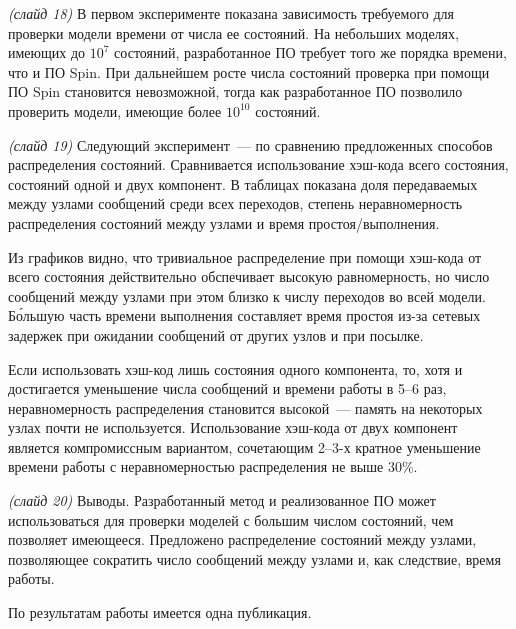 \documentclass[a4paper,12pt,notitlepage]{article}
\begin{document}
\emph{(слайд 18)} В первом эксперименте показана зависимость требуемого для проверки
модели времени от числа ее состояний. На небольших моделях, имеющих до $10^7$ состояний,
разработанное ПО требует того же порядка времени, что и ПО Spin. При дальнейшем росте
числа состояний проверка при помощи ПО Spin становится невозможной, тогда как
разработанное ПО позволило проверить модели, имеющие более $10^{10}$ состояний.


\emph{(слайд 19)} Следующий эксперимент~--- по сравнению предложенных способов
распределения состояний. Сравнивается использование хэш-кода всего состояния, состояний
одной и двух компонент. В таблицах показана доля передаваемых между узлами сообщений среди
всех переходов, степень неравномерность распределения состояний между узлами и время
простоя/выполнения.

Из графиков видно, что тривиальное распределение при помощи хэш-кода от всего состояния
действительно обспечивает высокую равномерность, но число сообщений между узлами при этом
близко к числу переходов во всей модели. Б\'{о}льшую часть времени выполнения составляет
время простоя из-за сетевых задержек при ожидании сообщений от других узлов и при посылке.

Если использовать хэш-код лишь состояния одного компонента, то, хотя и достигается
уменьшение числа сообщений и времени работы в 5--6 раз, неравномерность распределения
становится высокой~--- память на некоторых узлах почти не используется. Использование
хэш-кода от двух компонент является компромиссным вариантом, сочетающим 2--3-х кратное
уменьшение времени работы с неравномерностью распределения не выше 30\%.

\emph{(слайд 20)} Выводы. Разработанный метод и реализованное ПО может использоваться для
проверки моделей с большим числом состояний, чем позволяет имеющееся. Предложено
распределение состояний между узлами, позволяющее сократить число сообщений между узлами
и, как следствие, время работы.

По результатам работы имеется одна публикация.
\end{document}
